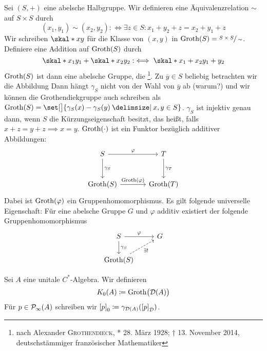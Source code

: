 \begin{erinnerungA}[label=err:64]
	Sei $(S,+)$ eine abelsche Halbgruppe.
	Wir definieren eine Äquivalenzrelation $\sim$ auf $S \times S$ durch
	\[
		(x_1 , y_1 ) \sim (x_2,y_2) :\iff \exists z \in S : x_1 +y_2 + z  = x_2 + y_1 + z
	\]
	Wir schreiben $\skal*{x}{y}$ für die Klasse von $(x,y)$ in $\Groth(S) = \sfrac{S \times S}{\sim}$.
	Definiere eine Addition  auf $\Groth(S)$ durch
	\[
		\skal*{x_1}{y_1} + \skal*{x_2}{y_2} :\iff \skal*{x_1 +x_2}{y_1 +y_2}
	\]
	$\Groth(S)$ ist dann eine abelsche Gruppe, die \footnote{nach Alexander \textsc{Grothendieck}, * 28. März 1928; † 13. November 2014, deutschstämmiger französischer Mathematiker}.
	Zu $\overline{y} \in S$ beliebig betrachten wir die Abbildung 
	Dann hängt $\gamma_S$ nicht von der Wahl von $\overline{y}$ ab (warum?) und wir können die Grothendiekgruppe auch schreiben als $\Groth(S) = \set[\big]{\gamma_S(x) - \gamma_S(y) \given x,y \in S}$.
	$\gamma_S$ ist injektiv genau dann, wenn $S$ die Kürzungseigenschaft besitzt, das heißt, falls $x+z = y+ z \implies x=y$.
	$\Groth(\cdot)$ ist ein Funktor bezüglich additiver Abbildungen:
	\[
		\begin{tikzcd}[sep =large]
			S \rar["\varphi"] \dar["\gamma_S"] & T \dar["\gamma_T"] \\
			\Groth(S) \rar["\Groth(\varphi)"] & \Groth(T)
		\end{tikzcd}
	\]
	Dabei ist $\Groth(\varphi)$ ein Gruppenhomomorphismus.
	Es gilt folgende universelle Eigenschaft: Für eine abelsche Gruppe $G$  und $\varphi$ additiv existiert der folgende Gruppenhomomorphismus
	\[
		\begin{tikzcd}
			S \dar["\gamma_S"] \rar["\varphi"] & G \\
			\Groth(S) \urar[dashed,"\exists!"']
		\end{tikzcd}
	\]
\end{erinnerungA}

\begin{definition}[{name=[{$K_0$-Gruppe einer unitalen $C^*$-Algebra}]}]
	Sei $A$ eine unitale $C^*$-Algebra.
	Wir definieren
	\[
		K_0(A) \coloneqq \Groth \enbrace[\big]{\mathcal{D}(A)}
	\]
	Für $p \in \Pinfty(A)$ schreiben wir $\benbrace*{p}_0 \coloneqq \gamma_{\mathcal{D}(A)} \enbrace*{\benbrace*{p}_{\mathcal{D}}}$.
\end{definition}


